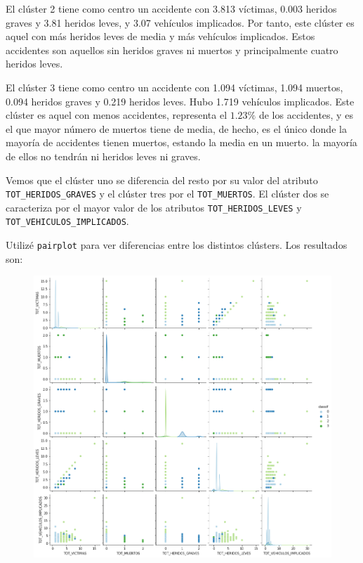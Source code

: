 \documentclass[a4]{article}
\begin{document}
El clúster 2 tiene como centro un accidente con 3.813 víctimas, 0.003 heridos graves y 3.81 heridos leves, y 3.07 vehículos implicados. Por tanto, este clúster es aquel con más heridos leves de media y más vehículos implicados. Estos accidentes son aquellos sin heridos graves ni muertos y principalmente cuatro heridos leves.

El clúster 3 tiene como centro un accidente con 1.094 víctimas, 1.094 muertos, 0.094 heridos graves y 0.219 heridos leves. Hubo 1.719 vehículos implicados. Este clúster es aquel con menos accidentes, representa el $1.23\%$ de los accidentes, y es el que mayor número de muertos tiene de media, de hecho, es el único donde la mayoría de accidentes tienen muertos, estando la media en un muerto. la mayoría de ellos no tendrán ni heridos leves ni graves.

Vemos que el clúster uno se diferencia del resto por su valor del atributo \texttt{TOT\_HERIDOS\_GRAVES} y el clúster tres por el \texttt{TOT\_MUERTOS}. El clúster dos se caracteriza por el mayor valor de los atributos \texttt{TOT\_HERIDOS\_LEVES} y \\\texttt{TOT\_VEHICULOS\_IMPLICADOS}.

Utilizé \texttt{pairplot} para ver diferencias entre los distintos clústers. Los resultados son:

\begin{figure}[H]
  \centering
  \includegraphics[width=148mm]{imagenes/c3_kmeans_pairplot}
\end{figure}
\end{document}
